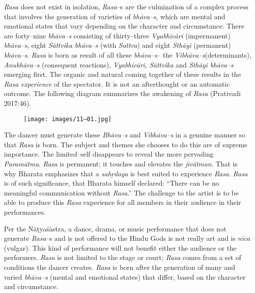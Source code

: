 \textit{Rasa} does not exist in isolation, \textit{Rasa}–s are the culmination of a complex process that involves the generation of varieties of \textit{bhāva–s}, which are mental and emotional states that vary depending on the character and circumstance. There are forty–nine \textit{bhāva–s }consisting of thirty–three \textit{Vyabhicāri} (impermanent) \textit{bhāva–s}, eight \textit{Sāttvika bhāva–s} (with \textit{Sattva}) and eight \textit{Sthāyi} (permanent) \textit{bhāva–s}. \textit{Rasa} is born as result of all these \textit{bhāva–s}– the \textit{Vibhāva–s}(determinants), \textit{Anubhāva–s} (consequent reactions), \textit{Vyabhicāri, Sāttvika} and \textit{Sthāyi bhāva–s }emerging first. The organic and natural coming together of these results in the \textit{Rasa experience }of the spectator. It is not an afterthought or an automatic outcome. The following diagram summarizes the awakening of \textit{Rasa} (Prativadi 2017:46).

\begin{figure}[!htbp]
\texttt{[image: images/11–01.jpg]}
\end{figure}

The dancer must generate these \textit{Bhāva–s} and \textit{Vibhāva–s} in a genuine manner so that \textit{Rasa} is born. The subject and themes she chooses to do this are of supreme importance. The limited–self disappears to reveal the more pervading \textit{Paramātma}. \textit{Rasa} is permanent; it touches and elevates the \textit{jīvātman}. That is why Bharata emphasizes that a \textit{sahṛdaya} is best suited to experience \textit{Rasa}. \textit{Rasa} is of such significance, that Bharata himself declared: “There can be no meaningful communication without \textit{Rasa}.” The challenge to the artist is to be able to produce this \textit{Rasa} experience for all members in their audience in their performances.

Per the Nāṭyaśāstra, a dance, drama, or music performance that does not generate \textit{Rasa}–s and is not offered to the Hindu Gods is not really art and is \textit{nīca }(vulgar). This kind of performance will not benefit either the audience or the performers. \textit{Rasa} is not limited to the stage or court; \textit{Rasa} comes from a set of conditions the dancer creates. \textit{Rasa} is born after the generation of many and varied \textit{bhāva–s} (mental and emotional states) that differ, based on the character and circumstance.


